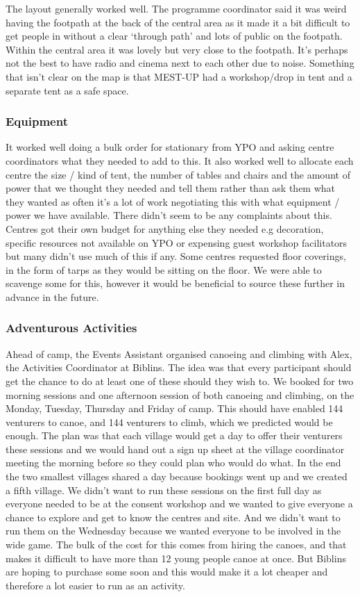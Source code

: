 
The layout generally worked well. The programme coordinator said it was weird having the footpath at the back of the central area as it made it a bit difficult to get people in without a clear `through path' and lots of public on the footpath.\\

Within the central area it was lovely but very close to the footpath. It's perhaps not the best to have radio and cinema next to each other due to noise. Something that isn't clear on the map is that MEST-UP had a workshop/drop in tent and a separate tent as a safe space.
\subsubsection{Equipment}
It worked well doing a bulk order for stationary from YPO and asking centre coordinators what they needed to add to this. It also worked well to allocate each centre the size / kind of tent, the number of tables and chairs and the amount of power that we thought they needed and tell them rather than ask them what they wanted as often it's a lot of work negotiating this with what equipment / power we have available. There didn't seem to be any complaints about this. Centres got their own budget for anything else they needed e.g decoration, specific resources not available on YPO or expensing guest workshop facilitators but many didn't use much of this if any. Some centres requested floor coverings, in the form of tarps as they would be sitting on the floor. We were able to scavenge some for this, however it would be beneficial to source these further in advance in the future.
\subsubsection{Adventurous Activities}
Ahead of camp, the Events Assistant organised canoeing and climbing with Alex, the Activities Coordinator at Biblins. The idea was that every participant should get the chance to do at least one of these should they wish to. We booked for two morning sessions and one afternoon session of both canoeing and climbing, on the Monday, Tuesday, Thursday and Friday of camp. This should have enabled 144 venturers to canoe, and 144 venturers to climb, which we predicted would be enough. The plan was that each village would get a day to offer their venturers these sessions and we would hand out a sign up sheet at the village coordinator meeting the morning before so they could plan who would do what. In the end the two smallest villages shared a day because bookings went up and we created a fifth village. We didn't want to run these sessions on the first full day as everyone needed to be at the consent workshop and we wanted to give everyone a chance to explore and get to know the centres and site. And we didn't want to run them on the Wednesday because we wanted everyone to be involved in the wide game. The bulk of the cost for this comes from hiring the canoes, and that makes it difficult to have more than 12 young people canoe at once. But Biblins are hoping to purchase some soon and this would make it a lot cheaper and therefore a lot easier to run as an activity.\\

